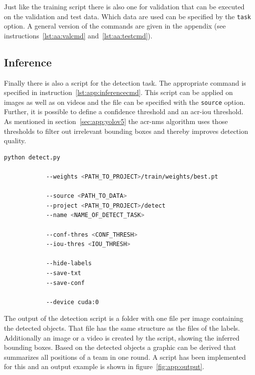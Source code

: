 Just like the training script there is also one for validation that can be executed on the validation and 
test data. Which data are used can be specified by the \texttt{task} option. A general version of the 
commands are given in the appendix (see instructions~\ref{lst:aa:valcmd} and~\ref{lst:aa:testcmd}).

\subsection{Inference}\label{subsec:app:inference}

Finally there is also a script for the detection task. The appropriate command is 
specified in instruction~\ref{lst:app:inferencecmd}. This script can be applied on images as well as 
on videos and the file can be specified with the \texttt{source} option. Further, it is possible to define 
a confidence threshold and an \gls{acr-iou} threshold. As mentioned in section~\ref{sec:app:yolov5} 
the \gls{acr-nms} algorithm uses those thresholds to filter out irrelevant bounding boxes and thereby 
improves detection quality. 

\begin{minipage}{\linewidth}
	\vspace*{0.3cm}
	\begin{lstlisting}[language=Bash, keywordstyle=\color{black}, 
		caption=General command to start the detection with YOLOv5., label=lst:app:inferencecmd]
		python detect.py
		
			--weights <PATH_TO_PROJECT>/train/weights/best.pt
			
			--source <PATH_TO_DATA>
			--project <PATH_TO_PROJECT>/detect
			--name <NAME_OF_DETECT_TASK>
			
			--conf-thres <CONF_THRESH>
			--iou-thres <IOU_THRESH>
			
			--hide-labels
			--save-txt
			--save-conf
						
			--device cuda:0
	\end{lstlisting}
\end{minipage}

The output of the detection script is a folder with one file per image containing the detected objects. 
That file has the same structure as the files of the labels. Additionally an image or a video is 
created by the script, showing the inferred bounding boxes. Based on the detected objects a graphic 
can be derived that summarizes all positions of a team in one round. A script has been implemented 
for this and an output example is shown in figure~\ref{fig:app:output}.
